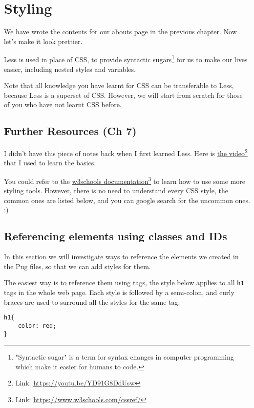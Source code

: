 \chapter{Styling}
\label{sec:styling}

We have wrote the contents for our abouts page in the previous chapter. Now let's make it look prettier.
\vspace{6mm}

Less is used in place of CSS, to provide syntactic sugars\footnote{"Syntactic sugar" is a term for syntax changes in computer programming which make it easier for humans to code.} for us to make our lives easier, including nested styles and variables. 

Note that all knowledge you have learnt for CSS can be transferable to Less, because Less is a superset of CSS. However, we will start from scratch for those of you who have not learnt CSS before.

\section{Further Resources (Ch 7)}

I didn't have this piece of notes back when I first learned Less. Here is \href{https://youtu.be/YD91G8DdUsw}{the video}\footnote{Link: \url{https://youtu.be/YD91G8DdUsw}} that I used to learn the basics. 

You could refer to the \href{https://www.w3schools.com/cssref/}{w3schools documentation}\footnote{Link: \url{https://www.w3schools.com/cssref/}} to learn how to use some more styling tools. However, there is no need to understand every CSS style, the common ones are listed below, and you can google search for the uncommon ones. :)

\section{Referencing elements using classes and IDs}

In this section we will investigate ways to reference the elements we created in the Pug files, so that we can add styles for them.

The easiest way is to reference them using tags, the style below applies to all \texttt{h1} tags in the whole web page. Each style is followed by a semi-colon, and curly braces are used to surround all the styles for the same tag.

\begin{lstlisting}[language=pug]
h1{
    color: red;
}
\end{lstlisting}

